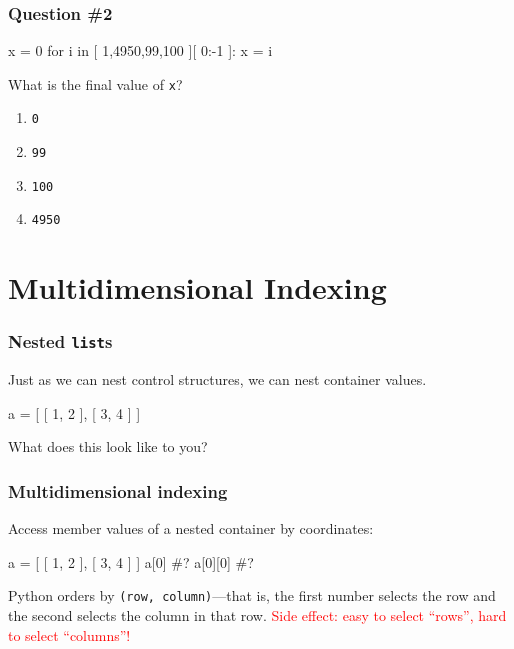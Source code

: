 \documentclass[11pt]{beamer}
\begin{document}
\begin{frame}[fragile]
	\frametitle{Question \#2}
	\Enlarge
	
	\begin{semiverbatim}
x = 0
for i in [ 1,4950,99,100 ][ 0:-1 ]:
   x = i
   \end{semiverbatim}
	What is the final value of \texttt{x}?
	\begin{enumerate}[label=\Alph*]
		\item  \texttt{0}
		\item  \texttt{99}  %
		\item  \texttt{100}
		\item  \texttt{4950}
	\end{enumerate}
\end{frame}


\section{Multidimensional Indexing}

\begin{frame}[fragile]
  \frametitle{Nested \texttt{list}s}
  \Enlarge

  \begin{itemize}
  \myitem  Just as we can nest control structures, we can nest container values. %
  \end{itemize}
  \begin{semiverbatim}
a = [ [ 1, 2 ], [ 3, 4 ] ]
  \end{semiverbatim}
  \begin{itemize}
  \myitem  What does this look like to you?
  \end{itemize}
\end{frame}

\begin{frame}[fragile]
  \frametitle{Multidimensional indexing}
  \Enlarge

  \begin{itemize}
  \myitem  Access member values of a nested container by coordinates: %
  \end{itemize}
  \begin{semiverbatim}
a = [ [ 1, 2 ], [ 3, 4 ] ]
a[0]    #? %
a[0][0] #? %
  \end{semiverbatim}
  \begin{itemize}
  \myitem  Python orders by \texttt{(row, column)}---that is, the first number selects the row and the second selects the column in that row. %
  \myitem  \textcolor{red}{Side effect:  easy to select ``rows'', hard to select ``columns''!}
  \end{itemize}
\end{frame}
\end{document}

